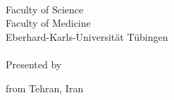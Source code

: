 
\begin{titlepage}

  \begin{addmargin}[-1cm]{-3cm}
    \begin{center}
      \textit{}\\[1cm]
      
      
      \Large\textit{\myTitle} \\ \bigskip %

      \textit{}\\[1.8cm]

      \large \mySubtitle \\[0.8cm]

      \textit{}\\[1.8cm]
      {\NIP}\\[0.5cm]


      {Faculty of Science\\
        Faculty of Medicine}\\[0.5cm]

      {Eberhard-Karls-Universit\"at T\"ubingen}\\[0.5cm]
      
      
      \textit{}\\[1.8cm]
      {Presented by}\\

      \myName


      from Tehran, Iran \\[0.5cm]

      \textit{}\\[1.8cm]


      \myTime\ %


    \end{center}
  \end{addmargin}

\end{titlepage}